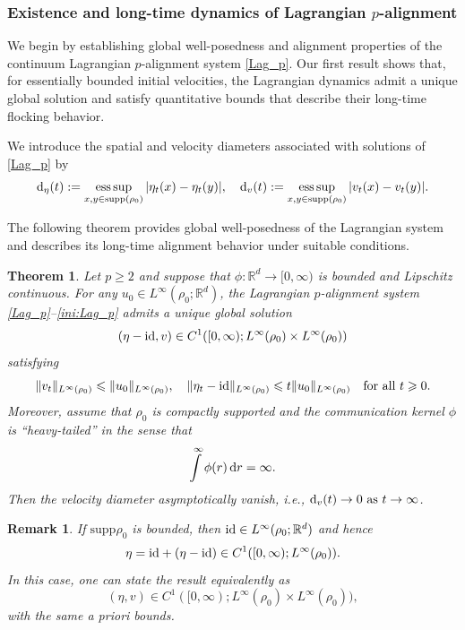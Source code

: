 \documentclass[10pt,reqno]{amsart}
\DeclareMathOperator*{\esssup}{ess\,sup}
\renewcommand{\ge}{\geqslant}
\renewcommand{\le}{\leqslant}
\numberwithin{equation}{section}
\newtheorem{theorem}{Theorem}[section]
\newtheorem{remark}{Remark}[section]
\newcommand{\R}{\mathbb R}
\newcommand{\bq}{\begin{equation}}
\newcommand{\eq}{\end{equation}}
\newcommand{\rd}{\textnormal{d}}
\newcommand{\dr}{\textnormal{d}r}
\newcommand{\supp}{\text{supp}}
\begin{document}


                      


 \subsubsection{Existence and long-time dynamics of Lagrangian $p$-alignment}
We begin by establishing global well-posedness and alignment properties of the continuum Lagrangian $p$-alignment system \eqref{Lag_p}. Our first result shows that, for essentially bounded initial velocities, the Lagrangian dynamics admit a unique global solution and satisfy quantitative bounds that describe their long-time flocking behavior.

We introduce the spatial and velocity diameters associated with solutions of \eqref{Lag_p} by
 \[
 \rd_\eta(t): = \esssup_{x,y \in \supp(\rho_0)}|\eta_t(x) - \eta_t(y)|, \quad  \rd_v(t): = \esssup_{x,y \in \supp(\rho_0)}|v_t(x) - v_t(y)|.
 \]
 
 The following theorem provides global well-posedness of the Lagrangian system and describes its long-time alignment behavior under suitable conditions.
 

 \begin{theorem}\label{thm:ext} Let  $p\ge2$ and suppose that $\phi:\R^d\to[0,\infty)$ is bounded and Lipschitz continuous. 
For any $u_0\in  L^\infty(\rho_0; \R^d)$, the Lagrangian $p$-alignment system \eqref{Lag_p}--\eqref{ini:Lag_p} admits a unique global solution
\bq\label{reg_Lag}
(\eta - {\rm id},v)\in C^1([0,\infty);L^\infty(\rho_0)\times  L^\infty(\rho_0))
\eq
satisfying
\[
\|v_t\|_{L^\infty(\rho_0)} \le \|u_0\|_{L^\infty(\rho_0)},  \quad  \|\eta_t-{\rm id}\|_{L^\infty(\rho_0)} \le t \|u_0\|_{L^\infty(\rho_0)} \quad\text{for all }t\ge0.
\]
 Moreover, assume that $\rho_0$ is compactly supported and the communication kernel $\phi$ is ``heavy-tailed'' in the sense that
\bq\label{condi_phi}
\int \limits^\infty \phi(r)\,\dr = \infty.
\eq
Then the velocity diameter asymptotically vanish, i.e.,
$\rd_v(t) \to 0 \  \text{as } t \to \infty$.
 \end{theorem}
 
 
 \begin{remark}If $\supp\rho_0$ is bounded, then ${\rm id}\in L^\infty(\rho_0;\R^d)$ and hence 
\[
\eta={\rm id}+(\eta-{\rm id})\in C^1([0,\infty);L^\infty(\rho_0)).
\] 
In this case, one can state the result equivalently as 
\[
(\eta,v)\in   C^1([0,\infty);L^\infty(\rho_0)\times  L^\infty(\rho_0)),
\]
with the same a priori bounds.
\end{remark}
\end{document}
